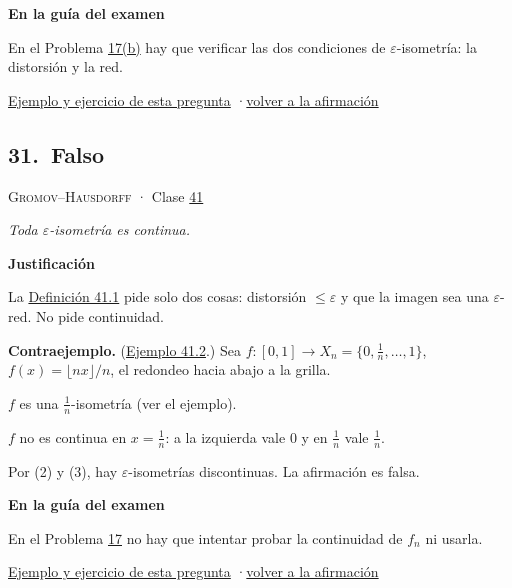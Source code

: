 \documentclass[11pt,a4paper]{article}
\newcommand{\bloque}[1]{\par\smallskip\noindent\textbf{\color{acento}#1}\par}
\begin{document}
\bloque{En la guía del examen}
\begin{pasos}
\item[] En el Problema \hyperlink{prob-17}{17(b)} hay que verificar las dos condiciones de $\varepsilon$-isometría: la distorsión y la red.
\end{pasos}
\par{}
\par{\small \hyperlink{e-30}{Ejemplo y ejercicio de esta pregunta} \quad·\quad \hyperlink{q-30}{volver a la afirmación}}
\subsection*{\hypertarget{r-31}{}31.\ \textcolor{bad}{Falso}}
{\small \textsc{Gromov–Hausdorff} · Clase \href{https://decostruttivismo.github.io/MAT2514-repaso/pdf/MAT2514_apuntes_completos.pdf\#nameddest=section.41}{41}}\par
\emph{Toda $\varepsilon$-isometría es continua.}
\bloque{Justificación}
\begin{pasos}
\item[(1)] La \href{https://decostruttivismo.github.io/MAT2514-repaso/pdf/MAT2514_apuntes_completos.pdf\#nameddest=teorema.41.1}{Definición 41.1} pide solo dos cosas: distorsión $\le\varepsilon$ y que la imagen sea una $\varepsilon$-red. No pide continuidad.
\item[] \textbf{Contraejemplo.} (\href{https://decostruttivismo.github.io/MAT2514-repaso/pdf/MAT2514_apuntes_completos.pdf\#nameddest=teorema.41.2}{Ejemplo 41.2}.) Sea $f\colon[0,1]\to X_n=\{0,\frac1n,\dots,1\}$, $f(x)=\lfloor nx\rfloor/n$, el redondeo hacia abajo a la grilla.
\item[(2)] $f$ es una $\frac1n$-isometría (ver el ejemplo).
\item[(3)] $f$ no es continua en $x=\frac1n$: a la izquierda vale $0$ y en $\frac1n$ vale $\frac1n$.
\item[] Por (2) y (3), hay $\varepsilon$-isometrías discontinuas. La afirmación es falsa.
\end{pasos}
\bloque{En la guía del examen}
\begin{pasos}
\item[] En el Problema \hyperlink{prob-17}{17} no hay que intentar probar la continuidad de $f_n$ ni usarla.
\end{pasos}
\par{}
\par{\small \hyperlink{e-31}{Ejemplo y ejercicio de esta pregunta} \quad·\quad \hyperlink{q-31}{volver a la afirmación}}
\end{document}
